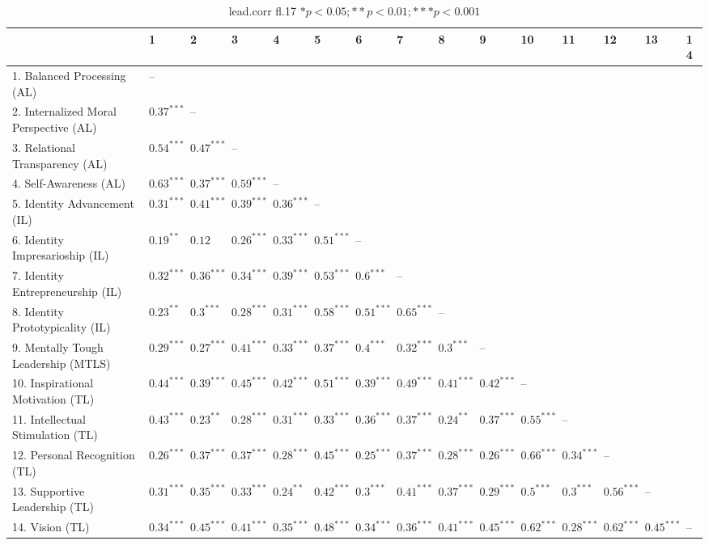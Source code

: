\begin{table}[ht]
\centering
\begin{tabular}{lllllllllllllll}
  \hline
 & 1 & 2 & 3 & 4 & 5 & 6 & 7 & 8 & 9 & 10 & 11 & 12 & 13 & 14 \\ 
  \hline
1. Balanced Processing (AL) & -- &  &  &  &  &  &  &  &  &  &  &  &  &  \\ 
  2. Internalized Moral Perspective (AL) & $0.37^{***}$ & -- &  &  &  &  &  &  &  &  &  &  &  &  \\ 
  3. Relational Transparency (AL) & $0.54^{***}$ & $0.47^{***}$ & -- &  &  &  &  &  &  &  &  &  &  &  \\ 
  4. Self-Awareness (AL) & $0.63^{***}$ & $0.37^{***}$ & $0.59^{***}$ & -- &  &  &  &  &  &  &  &  &  &  \\ 
  5. Identity Advancement (IL) & $0.31^{***}$ & $0.41^{***}$ & $0.39^{***}$ & $0.36^{***}$ & -- &  &  &  &  &  &  &  &  &  \\ 
  6. Identity Impresarioship (IL) & $0.19^{**}$ & $0.12$ & $0.26^{***}$ & $0.33^{***}$ & $0.51^{***}$ & -- &  &  &  &  &  &  &  &  \\ 
  7. Identity Entrepreneurship (IL) & $0.32^{***}$ & $0.36^{***}$ & $0.34^{***}$ & $0.39^{***}$ & $0.53^{***}$ & $0.6^{***}$ & -- &  &  &  &  &  &  &  \\ 
  8. Identity Prototypicality (IL) & $0.23^{**}$ & $0.3^{***}$ & $0.28^{***}$ & $0.31^{***}$ & $0.58^{***}$ & $0.51^{***}$ & $0.65^{***}$ & -- &  &  &  &  &  &  \\ 
  9. Mentally Tough Leadership (MTLS) & $0.29^{***}$ & $0.27^{***}$ & $0.41^{***}$ & $0.33^{***}$ & $0.37^{***}$ & $0.4^{***}$ & $0.32^{***}$ & $0.3^{***}$ & -- &  &  &  &  &  \\ 
  10. Inspirational Motivation (TL) & $0.44^{***}$ & $0.39^{***}$ & $0.45^{***}$ & $0.42^{***}$ & $0.51^{***}$ & $0.39^{***}$ & $0.49^{***}$ & $0.41^{***}$ & $0.42^{***}$ & -- &  &  &  &  \\ 
  11. Intellectual Stimulation (TL) & $0.43^{***}$ & $0.23^{**}$ & $0.28^{***}$ & $0.31^{***}$ & $0.33^{***}$ & $0.36^{***}$ & $0.37^{***}$ & $0.24^{**}$ & $0.37^{***}$ & $0.55^{***}$ & -- &  &  &  \\ 
  12. Personal Recognition (TL) & $0.26^{***}$ & $0.37^{***}$ & $0.37^{***}$ & $0.28^{***}$ & $0.45^{***}$ & $0.25^{***}$ & $0.37^{***}$ & $0.28^{***}$ & $0.26^{***}$ & $0.66^{***}$ & $0.34^{***}$ & -- &  &  \\ 
  13. Supportive Leadership (TL) & $0.31^{***}$ & $0.35^{***}$ & $0.33^{***}$ & $0.24^{**}$ & $0.42^{***}$ & $0.3^{***}$ & $0.41^{***}$ & $0.37^{***}$ & $0.29^{***}$ & $0.5^{***}$ & $0.3^{***}$ & $0.56^{***}$ & -- &  \\ 
  14. Vision (TL) & $0.34^{***}$ & $0.45^{***}$ & $0.41^{***}$ & $0.35^{***}$ & $0.48^{***}$ & $0.34^{***}$ & $0.36^{***}$ & $0.41^{***}$ & $0.45^{***}$ & $0.62^{***}$ & $0.28^{***}$ & $0.62^{***}$ & $0.45^{***}$ & -- \\ 
   \hline
\end{tabular}
\caption{lead.corr fl.17 $* p < 0.05; ** p < 0.01; *** p < 0.001$} 
\label{freq_corr.lead.corr.fl.17}
\end{table}
